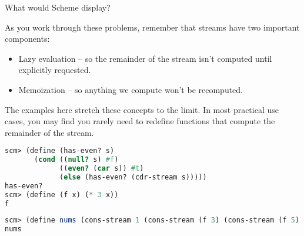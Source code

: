\question What would Scheme display?
\setlength{\medskipamount}{0pt}
\begin{solution}
As you work through these problems, remember that streams have two important
components:
\begin{itemize}
    \item Lazy evaluation -- so the remainder of the stream isn't computed until
        explicitly requested.
    \item Memoization -- so anything we compute won't be recomputed.
\end{itemize}
The examples here stretch these concepts to the limit. In most practical use
cases, you may find you rarely need to redefine functions that compute the
remainder of the stream.
\end{solution}

\begin{lstlisting}[language=Scheme]
scm> (define (has-even? s)
       (cond ((null? s) #f)
             ((even? (car s)) #t)
             (else (has-even? (cdr-stream s)))))
has-even?
scm> (define (f x) (* 3 x))
f
\end{lstlisting}
\begin{lstlisting}[language=Scheme]
scm> (define nums (cons-stream 1 (cons-stream (f 3) (cons-stream (f 5) nil))))
nums
\end{lstlisting}
